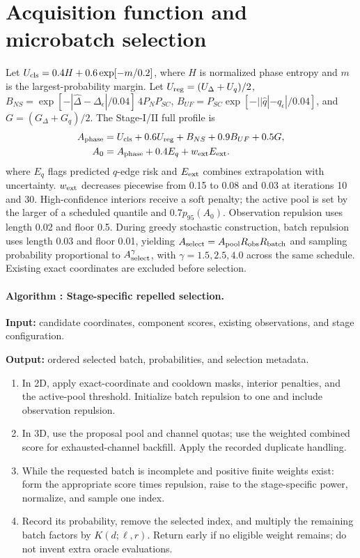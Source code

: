 \section{Acquisition function and microbatch selection}
Let $U_{\rm cls}=0.4H+0.6\exp[-m/0.2]$, where $H$ is normalized phase entropy and $m$ is the largest-probability margin. Let $U_{\rm reg}=(U_\Delta+U_q)/2$, $B_{NS}=\exp[-|\hat\Delta-\Delta_\epsilon|/0.04]\,4P_NP_{SC}$, $B_{UF}=P_{SC}\exp[-||\hat q|-q_\epsilon|/0.04]$, and $G=(G_\Delta+G_q)/2$.  The Stage-I/II full profile is
\begin{align} A_{\rm phase}&=U_{\rm cls}+0.6U_{\rm reg}+B_{NS}+0.9B_{UF}+0.5G,\notag\\ A_0&=A_{\rm phase}+0.4E_q+w_{\rm ext}E_{\rm ext}.\end{align}
where $E_q$ flags predicted $q$-edge risk and $E_{\rm ext}$ combines extrapolation with uncertainty. $w_{\rm ext}$ decreases piecewise from 0.15 to 0.08 and 0.03 at iterations 10 and 30. High-confidence interiors receive a soft penalty; the active pool is set by the larger of a scheduled quantile and $0.7p_{95}(A_0)$.  Observation repulsion uses length 0.02 and floor 0.5. During greedy stochastic construction, batch repulsion uses length 0.03 and floor 0.01, yielding $A_{\rm select}=A_{\rm pool}R_{\rm obs}R_{\rm batch}$ and sampling probability proportional to $A_{\rm select}^\gamma$, with $\gamma=1.5,2.5,4.0$ across the same schedule. Existing exact coordinates are excluded before selection.
\label{alg:batch}\paragraph{Algorithm \thealgorithm: Stage-specific repelled selection.}
\textbf{Input:} candidate coordinates, component scores, existing observations, and stage configuration.\par\textbf{Output:} ordered selected batch, probabilities, and selection metadata.
\begin{enumerate}
\item In 2D, apply exact-coordinate and cooldown masks, interior penalties, and the active-pool threshold. Initialize batch repulsion to one and include observation repulsion.
\item In 3D, use the proposal pool and channel quotas; use the weighted combined score for exhausted-channel backfill. Apply the recorded duplicate handling.
\item While the requested batch is incomplete and positive finite weights exist: form the appropriate score times repulsion, raise to the stage-specific power, normalize, and sample one index.
\item Record its probability, remove the selected index, and multiply the remaining batch factors by $K(d;\ell,r)$. Return early if no eligible weight remains; do not invent extra oracle evaluations.
\end{enumerate}



